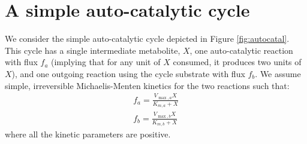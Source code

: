 \documentclass[a4page,notitlepage]{article}
\begin{document}
\section{A simple auto-catalytic cycle}
    We consider the simple auto-catalytic cycle depicted in Figure \ref{fig:autocatal}.
    This cycle has a single intermediate metabolite, $X$, one auto-catalytic reaction with flux $f_a$ (implying that for any unit of $X$ consumed, it produces two units of $X$), and one outgoing reaction using the cycle substrate with flux $f_b$.
    We assume simple, irreversible Michaelis-Menten kinetics for the two reactions such that:
    \begin{eqnarray*}
      f_a = \frac{V_{\max,a}X}{K_{m,a}+X} \\
      f_b = \frac{V_{\max,b}X}{K_{m,b}+X}
    \end{eqnarray*}
    where all the kinetic parameters are positive.
\end{document}
